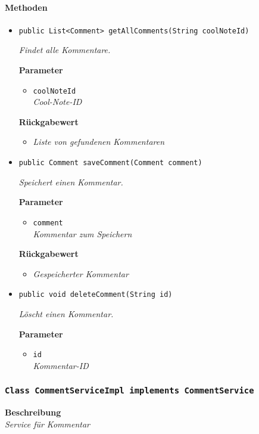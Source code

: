     \paragraph*{Methoden}
     \begin{itemize}
     	\item{\texttt{public List<Comment> getAllComments(String coolNoteId)}}
     	
     	\textit{Findet alle Kommentare.}
     	
     	\textbf{Parameter}
     	\begin{itemize}
     		\item\texttt{coolNoteId}\\
     		\textit{Cool-Note-ID}
     	\end{itemize}
     	
     	\textbf{Rückgabewert}
     	\begin{itemize}
     		\item\textit{Liste von gefundenen Kommentaren}
     	\end{itemize}
     
     \item{\texttt{public Comment saveComment(Comment comment)}}
     	
     	\textit{Speichert einen Kommentar.}
     	
     	\textbf{Parameter}
     	\begin{itemize}
     		\item\texttt{comment}\\
     		\textit{Kommentar zum Speichern}
     	\end{itemize}
     	
     	\textbf{Rückgabewert}
     	\begin{itemize}
     		\item\textit{Gespeicherter Kommentar}
     	\end{itemize}
     
     \item{\texttt{public void deleteComment(String id)}}
     	
     	\textit{Löscht einen Kommentar.}
     	
     	\textbf{Parameter}
     	\begin{itemize}
     		\item\texttt{id}\\
     		\textit{Kommentar-ID}
     	\end{itemize}
     \end{itemize}
     \subsubsection{\texttt{Class CommentServiceImpl implements CommentService}}
     \textbf{Beschreibung} \\
     \textit{Service für Kommentar}
